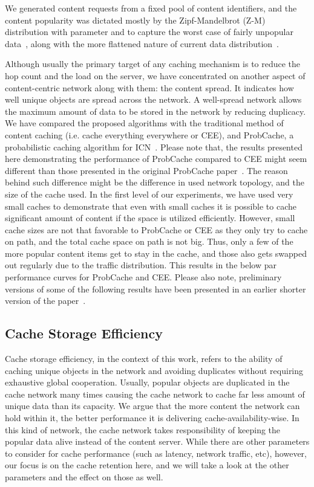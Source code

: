 \documentclass[article]{elsarticle}
\begin{document}
We generated content requests from a fixed pool of content identifiers, and the content popularity was dictated mostly by the Zipf-Mandelbrot (Z-M) distribution \cite{mandelbrot_1967} with parameter  and  to capture the worst case of fairly unpopular data~\cite{rossicaching}, along with the more flattened nature of current data distribution~\cite{hefeeda2008traffic, fayazbakhsh2013less}. 

Although usually the primary target of any caching mechanism is to reduce the hop count and the load on the server, we have concentrated on another aspect of content-centric network along with them: the content spread. It indicates how well unique objects are spread across the network. A well-spread network allows the maximum amount of data to be stored in the network by reducing duplicacy. We have compared the proposed algorithms with the traditional method of content caching (i.e. cache everything everywhere or CEE), and ProbCache, a probabilistic caching algorithm for ICN~\cite{psarasprobabilistic}. Please note that, the results presented here demonstrating the performance of ProbCache compared to CEE might seem different than those presented in the original ProbCache paper~\cite{psarasprobabilistic}. The reason behind such difference might be the difference in used network topology, and the size of the cache used. In the first level of our experiments, we have used very small caches to demonstrate that even with small caches it is possible to cache significant amount of content if the space is utilized efficiently. However, small cache sizes are not that favorable to ProbCache or CEE as they only try to cache on path, and the total cache space on path is not big. Thus, only a few of the more popular content items get to stay in the cache, and those also gets swapped out regularly due to the traffic distribution. This results in the below par performance curves for ProbCache and CEE. Please also note, preliminary versions of some of the following results have been presented in an earlier shorter version of the paper~\cite{myinfocom}.

\subsection{Cache Storage Efficiency}

Cache storage efficiency, in the context of this work, refers to the ability of caching unique objects in the network and avoiding duplicates without requiring exhaustive global cooperation. Usually, popular objects are duplicated in the cache network many times causing the cache network to cache far less amount of unique data than its capacity. We argue that the more content the network can hold within it, the better performance it is delivering cache-availability-wise. In this kind of network, the cache network takes responsibility of keeping the popular data alive instead of the content server. While there are other parameters to consider for cache performance (such as latency, network traffic, etc), however, our focus is on the cache retention here, and we will take a look at the other parameters and the effect on those as well.
\end{document}
